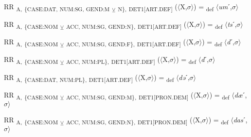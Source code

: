 {\begin{exe}
 RR \textsubscript{A,} \textsubscript{\{CASE:DAT, NUM:SG, GEND:M} \textsubscript{${\veebar}$}\textsubscript{ N\},} \textsubscript{DET1[ART.DEF]} ($\langle$X,$\sigma $$\rangle$) = \textsubscript{def} $\langle$\textit{um}ˊ,$\sigma $$\rangle$
\end{exe}

\begin{exe}
 RR \textsubscript{A,} \textsubscript{\{CASE:NOM} \textsubscript{${\veebar}$}\textsubscript{ ACC, NUM:SG, GEND:N\},} \textsubscript{DET1[ART.DEF]} ($\langle$X,$\sigma $$\rangle$) = \textsubscript{def} $\langle$\textit{ts}ˊ,$\sigma $$\rangle$
\end{exe}

\begin{exe}
 RR \textsubscript{A,} \textsubscript{\{CASE:NOM} \textsubscript{${\veebar}$}\textsubscript{ ACC, NUM:SG, GEND:F\},} \textsubscript{DET1[ART.DEF]} ($\langle$X,$\sigma $$\rangle$) = \textsubscript{def} $\langle$\textit{d}ˊ,$\sigma $$\rangle$
\end{exe}

\begin{exe}
 RR \textsubscript{A,} \textsubscript{\{CASE:NOM} \textsubscript{${\veebar}$}\textsubscript{ ACC, NUM:PL\},} \textsubscript{DET1[ART.DEF]} ($\langle$X,$\sigma $$\rangle$) = \textsubscript{def} $\langle$\textit{d}ˊ,$\sigma $$\rangle$
\end{exe}

\begin{exe}
 RR \textsubscript{A,} \textsubscript{\{CASE:DAT, NUM:PL\},} \textsubscript{DET1[ART.DEF]} ($\langle$X,$\sigma $$\rangle$) = \textsubscript{def} $\langle$\textit{də}ˊ,$\sigma $$\rangle$
\end{exe}

\begin{exe}
 RR \textsubscript{A,} \textsubscript{\{CASE:NOM} \textsubscript{${\veebar}$}\textsubscript{ ACC, NUM:SG, GEND:M\},} \textsubscript{DET1[PRON.DEM]} ($\langle$X,$\sigma $$\rangle$) = \textsubscript{def} $\langle$\textit{dæ}ˊ,$\sigma $$\rangle$
\end{exe}

\begin{exe}
 RR \textsubscript{A,} \textsubscript{\{CASE:NOM} \textsubscript{${\veebar}$}\textsubscript{ ACC, NUM:SG, GEND:N\},} \textsubscript{DET1[PRON.DEM]} ($\langle$X,$\sigma $$\rangle$) = \textsubscript{def} $\langle$\textit{das}ˊ,$\sigma $$\rangle$
\end{exe}

}
